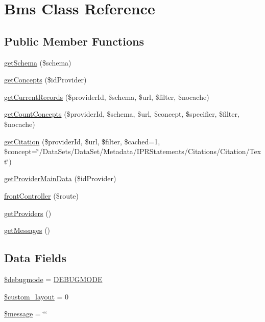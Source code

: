 \hypertarget{class_bms_1_1_bms}{}\section{Bms Class Reference}
\label{class_bms_1_1_bms}
\subsection*{Public Member Functions}
\begin{DoxyCompactItemize}
\item 
\hyperlink{class_bms_1_1_bms_abbd2b270b5a2e822a12646da90c6e48e}{get\+Schema} (\$schema)
\item 
\hyperlink{class_bms_1_1_bms_aad36f7a0d237b521e0c4cc4482895413}{get\+Concepts} (\$id\+Provider)
\item 
\hyperlink{class_bms_1_1_bms_a4ae0faba305bd7f8f82efc796a983b09}{get\+Current\+Records} (\$provider\+Id, \$schema, \$url, \$filter, \$nocache)
\item 
\hyperlink{class_bms_1_1_bms_af007633bad4e22ba700d331292e06fde}{get\+Count\+Concepts} (\$provider\+Id, \$schema, \$url, \$concept, \$specifier, \$filter, \$nocache)
\item 
\hyperlink{class_bms_1_1_bms_ae49caba006e4fd1521d7f96f427ce56a}{get\+Citation} (\$provider\+Id, \$url, \$filter, \$cached=1, \$concept=\char`\"{}/Data\+Sets/Data\+Set/Metadata/I\+P\+R\+Statements/Citations/Citation/Text\char`\"{})
\item 
\hyperlink{class_bms_1_1_bms_a5871c187d76524a84c7fed6dcc3d5169}{get\+Provider\+Main\+Data} (\$id\+Provider)
\item 
\hyperlink{class_bms_1_1_bms_aec5f7b55928d9eb969567ab87ea9e021}{front\+Controller} (\$route)
\item 
\hyperlink{class_bms_1_1_bms_a24b2edfc6aae484d67fbd177cf10e1b1}{get\+Providers} ()
\item 
\hyperlink{class_bms_1_1_bms_a7347b0b89cca1d7604e93f5b5e896fc4}{get\+Messages} ()
\end{DoxyCompactItemize}
\subsection*{Data Fields}
\begin{DoxyCompactItemize}
\item 
\hyperlink{class_bms_1_1_bms_a8d1821dbc83e2d0353770ec855a9621c}{\$debugmode} = \hyperlink{namespace_bms_a7af7ef3e15183adae80bfc7cf0272937}{D\+E\+B\+U\+G\+M\+O\+DE}
\item 
\hyperlink{class_bms_1_1_bms_abfac2de1f5278c24154a318274419e69}{\$custom\+\_\+layout} = 0
\item 
\hyperlink{class_bms_1_1_bms_abf17cb2dba2ed17cb28aa5f37deb5293}{\$message} = \char`\"{}\char`\"{}
\end{DoxyCompactItemize}


